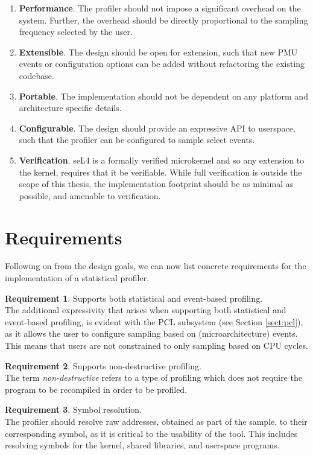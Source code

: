 \ssp\begin{enumerate}
    \item \textbf{Performance}. The profiler should not impose a significant overhead on the system. Further, the overhead should be directly proportional to the sampling frequency selected by the user.
    \item \textbf{Extensible}. The design should be open for extension, such that new PMU events or configuration options can be added without refactoring the existing codebase. 
    \item \textbf{Portable}. The implementation should not be dependent on any platform and architecture specific details.
    \item \textbf{Configurable}. The design should provide an expressive API to userspace, such that the profiler can be configured to sample select events. 
    \item \textbf{Verification}. seL4 is a formally verified microkernel and so any extension to the kernel, requires that it be verifiable. While full verification is outside the scope of this thesis, the implementation footprint should be as minimal as possible, and amenable to verification.
\end{enumerate}\dsp

\section{Requirements}

Following on from the design goals, we can now list concrete requirements for the implementation of a statistical profiler.

\textbf{Requirement 1}. Supports both statistical and event-based profiling.\\
The additional expressivity that arises when supporting both statistical and event-based profiling, is evident with the PCL subsystem (see Section \ref{sect:pcl}), as it allows the user to configure sampling based on (microarchitecture) events. This means that users are not constrained to only sampling based on CPU cycles.

\textbf{Requirement 2}. Supports non-destructive profiling.\\
The term \textit{non-destructive} refers to a type of profiling which does not require the program to be recompiled in order to be profiled. 

\textbf{Requirement 3}. Symbol resolution.\\
The profiler should resolve raw addresses, obtained as part of the sample, to their corresponding symbol, as it is critical to the usability of the tool. This includes resolving symbols for the kernel, shared libraries, and userspace programs.

